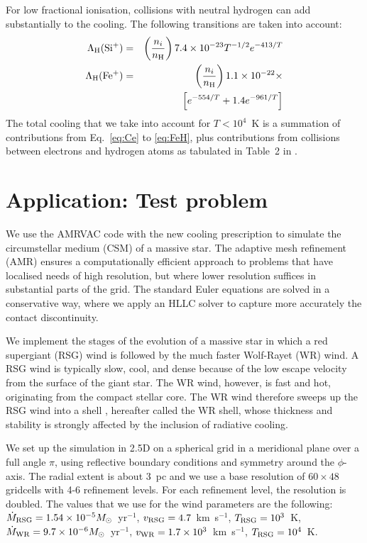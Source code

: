 \documentclass[floatfix,traditabstract,preprint2]{aa}
\begin{document}
For low fractional ionisation, collisions with neutral hydrogen can add substantially to the cooling. The following transitions are taken into account:
\begin{eqnarray}              
\Lambda_{\rm H}({\rm Si^+})&=&\left(\frac{n_i}{n_{\rm H}}\right)7.4\times10^{-23}T^{-1/2}e^{-413/T}\\
\label{eq:FeH}
\Lambda_{\rm H}({\rm Fe^+})&=&\left(\frac{n_i}{n_{\rm H}}\right)1.1\times10^{-22}\times\\\nonumber
                             &&\left[e^{-554/T}+1.4e^{-961/T}\right]
\end{eqnarray}
The total cooling that we take into account  for $T < 10^4$~K is a summation of contributions from Eq.~\ref{eq:Ce} to \ref{eq:FeH}, plus contributions from  collisions between electrons and hydrogen atoms as tabulated in Table~2 in \citet{1972DalgarnoMcCray}. 


\section{Application: Test problem}
\label{sec:test}

We use the AMRVAC code with the new cooling prescription to simulate the circumstellar medium (CSM) of a massive star. The adaptive mesh refinement (AMR) ensures a computationally efficient approach to problems that have localised needs of high resolution, but where lower resolution suffices in substantial parts of the grid. The standard Euler equations are solved in a conservative way, where we apply an HLLC solver \citep{1999Toro} to capture more accurately the contact discontinuity.

We implement the stages of the evolution of a massive star in which a red supergiant (RSG) wind is followed by the much faster Wolf-Rayet (WR) wind. A RSG wind is typically slow, cool, and dense because of the low escape velocity from the surface of the giant star. The WR wind, however, is fast and hot, originating from the compact stellar core. The WR wind therefore sweeps up the RSG wind into a shell \citep{1995GGSMacLow,1996GGSetal_II,2007Dwarkadas}, hereafter called the WR shell, whose thickness and stability is strongly affected by the inclusion of radiative cooling. 

We set up the simulation in 2.5D on a spherical grid in a meridional plane over a full angle $\pi$, using reflective boundary conditions and symmetry around the $\phi$-axis. The radial extent is about 3~pc and we use a base resolution of $60\times48$ gridcells with 4-6 refinement levels. For each refinement level, the resolution is doubled. The values that we use for the wind parameters are the following: $\dot M_{\rm RSG}=1.54\times 10^{-5} M_\odot$~yr$^{-1}$, $v_{\rm RSG}=4.7$~km~s$^{-1}$, $T_{\rm RSG}=10^3$~K, $\dot M_{\rm WR}=9.7\times 10^{-6} M_\odot$~yr$^{-1}$, $v_{\rm WR}=1.7\times10^3$~km~s$^{-1}$, $T_{\rm RSG}=10^4$~K. 
\end{document}
